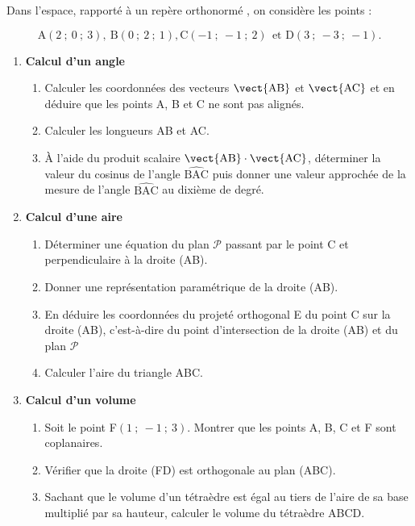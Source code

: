 \medskip

Dans l'espace, rapporté à un repère orthonormé \Oijk, on considère les points : 

\[\text{A}(2~;~0~;~3),\: \text{B}(0~;~2~;~1), \text{C}(-1~;~-1~;~2)\:\: \text{et D}(3~;~-3~;~ -1).\]
\smallskip

\begin{enumerate}
\item \textbf{Calcul d'un angle}
	\begin{enumerate}
		\item Calculer les coordonnées des vecteurs $\vect{\text{AB}}$ et $\vect{\text{AC}}$ et en déduire que les points A, B et C ne sont pas alignés.
		\item Calculer les longueurs AB et AC.
		\item À l'aide du produit scalaire $\vect{\text{AB}}\cdot \vect{\text{AC}}$, déterminer la valeur du cosinus de l'angle
$\widehat{\text{BAC}}$ puis donner une valeur approchée de la mesure de l'angle $\widehat{\text{BAC}}$ au dixième de degré.
	\end{enumerate}
\item \textbf{Calcul d'une aire}
	\begin{enumerate}
		\item Déterminer une équation du plan $\mathcal{P}$ passant par le point C et perpendiculaire à la droite (AB).
		\item Donner une représentation paramétrique de la droite (AB).
		\item En déduire les coordonnées du projeté orthogonal E du point C sur la droite
(AB), c'est-à-dire du point d'intersection de la droite (AB) et du plan $\mathcal{P}$
		\item Calculer l'aire du triangle ABC.
	\end{enumerate}
\item \textbf{Calcul d'un volume}
	\begin{enumerate}
		\item Soit le point F$(1~;~-1~;~3)$. Montrer que les points A, B, C et F sont coplanaires.
		\item Vérifier que la droite (FD) est orthogonale au plan (ABC).
		\item Sachant que le volume d'un tétraèdre est égal au tiers de l'aire de sa base
multiplié par sa hauteur, calculer le volume du tétraèdre ABCD.
	\end{enumerate}
\end{enumerate}

\bigskip
